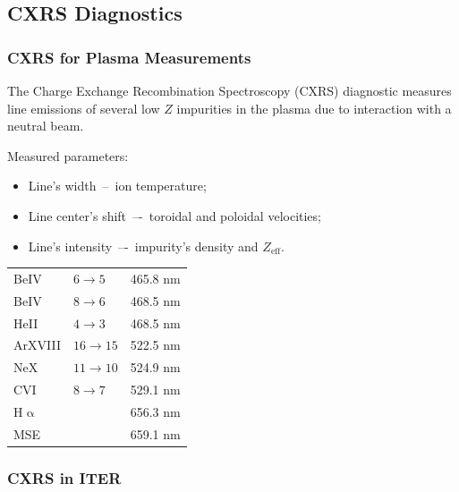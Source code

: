 \documentclass[../main.tex]{subfiles}
\begin{document}
\subsection{CXRS Diagnostics}
\subsubsection{CXRS for Plasma Measurements}
The Charge Exchange Recombination Spectroscopy (CXRS) diagnostic measures
line emissions of several low $Z$ impurities in the plasma due to interaction
with a neutral beam.

Measured parameters:
\begin{itemize}
    \item Line’s width~--~ion temperature;
    \item Line center’s shift~–-~toroidal and poloidal velocities;
    \item Line’s intensity~–-~impurity's density and $Z_\text{eff}$.
\end{itemize}

\begin{table}[ht]
    \centering
    \begin{tabular}[]{l l l}
        \toprule
        BeIV        & $6\to5$   & 465.8 nm \\
        BeIV        & $8\to6$   & 468.5 nm \\
        HeII        & $4\to3$   & 468.5 nm \\
        \midrule
        ArXVIII     & $16\to15$ & 522.5 nm \\
        NeX         & $11\to10$ & 524.9 nm \\
        CVI         & $8\to7$   & 529.1 nm \\
        \midrule
        H$\upalpha$ &           & 656.3 nm \\
        MSE         &           & 659.1 nm \\
        \bottomrule
    \end{tabular}
\end{table}

\subsubsection{CXRS in ITER}
\end{document}
